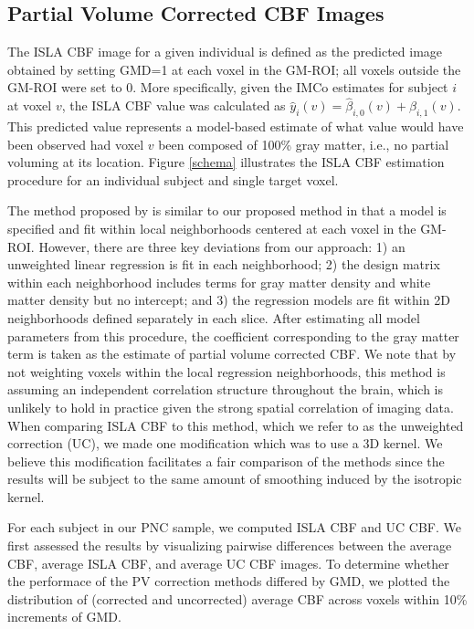 \documentclass[review]{elsarticle}
\begin{document}
\subsection{Partial Volume Corrected CBF Images}
\label{subsec:ISLA}

The ISLA CBF image for a given individual is defined as the predicted image obtained by setting GMD=1 at each voxel in the GM-ROI; all voxels outside the GM-ROI were set to 0. More specifically, given the IMCo estimates for subject $i$ at voxel $v$, the ISLA CBF value was calculated as $\hat{y}_{i}(v) = \hat{\beta}_{i, 0}(v) + \hat{\beta}_{i, 1}(v)$. This predicted value represents a model-based estimate of what value would have been observed had voxel $v$ been composed of 100\% gray matter, i.e., no partial voluming at its location. Figure \ref{schema} illustrates the ISLA CBF estimation procedure for an individual subject and single target voxel. 

The method proposed by \citep{ahlgren2014partial} is similar to our proposed method in that a model is specified and fit within local neighborhoods centered at each voxel in the GM-ROI. However, there are three key deviations from our approach: 1) an unweighted linear regression is fit in each neighborhood; 2) the design matrix within each neighborhood includes terms for gray matter density and white matter density but no intercept; and 3) the regression models are fit within 2D neighborhoods defined separately in each slice. After estimating all model parameters from this procedure, the coefficient corresponding to the gray matter term is taken as the estimate of partial volume corrected CBF. We note that by not weighting voxels within the local regression neighborhoods, this method is assuming an independent correlation structure throughout the brain, which is unlikely to hold in practice given the strong spatial correlation of imaging data. When comparing ISLA CBF to this method, which we refer to as the unweighted correction (UC), we made one modification which was to use a 3D kernel. We believe this modification facilitates a fair comparison of the methods since the results will be subject to the same amount of smoothing induced by the isotropic kernel.

For each subject in our PNC sample, we computed ISLA CBF and UC CBF. We first assessed the results by visualizing pairwise differences between the average CBF, average ISLA CBF, and average UC CBF images. To determine whether the performace of the PV correction methods differed by GMD, we plotted the distribution of (corrected and uncorrected) average CBF across voxels within 10\% increments of GMD.  
\end{document}
